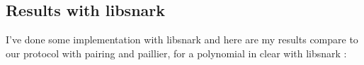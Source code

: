 \subsection{Results with libsnark}
I've done some implementation with libsnark and here are my results compare to our protocol with pairing and paillier, for a polynomial in clear with libsnark :



